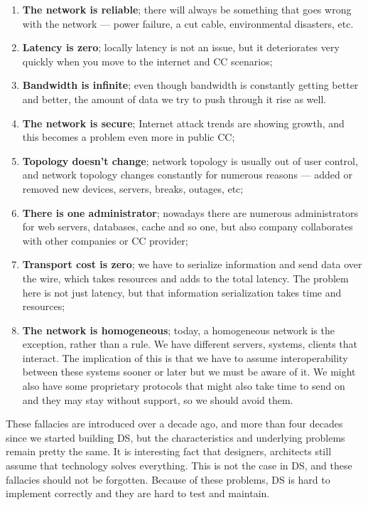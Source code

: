 \begin{enumerate}[start=1,label={(\bfseries \arabic*)}]\label{ds:8_fallacies}
	\item \textbf{The network is reliable}; there will always be something that goes wrong with the network --- power failure, a cut cable, environmental disasters, etc.
	\item \textbf{Latency is zero}; locally latency is not an issue, but it deteriorates very quickly when you move to the internet and CC scenarios;
	\item \textbf{Bandwidth is infinite}; even though bandwidth is constantly getting better and better, the amount of data we try to push through it rise as well.
	\item \textbf{The network is secure};  Internet attack trends are showing growth, and this becomes a problem even more in public CC;
	\item \textbf{Topology doesn't change}; network topology is usually out of user control, and network topology changes constantly for numerous reasons --- added or removed new devices, servers, breaks, outages, etc;
	\item \textbf{There is one administrator}; nowadays there are numerous administrators for web servers, databases, cache and so one, but also company collaborates with other companies or CC provider;
	\item \textbf{Transport cost is zero}; we have to serialize information and send data over the wire, which takes resources and adds to the total latency. The problem here is not just latency, but that information serialization takes time and resources;
	\item \textbf{The network is homogeneous}; today, a homogeneous network is the exception, rather than a rule. We have different servers, systems, clients that interact. The implication of this is that we have to assume interoperability between these systems sooner or later but we must be aware of it. We might also have some proprietary protocols that might also take time to send on and they may stay without support, so we should avoid them.
\end{enumerate}

\noindent
These fallacies are introduced over a decade ago, and more than four decades since we started building DS, but the characteristics and underlying problems remain pretty the same. It is interesting fact that designers, architects still assume that technology solves everything. This is not the case in DS, and these fallacies should not be forgotten. Because of these problems, DS is hard to implement correctly and they are hard to test and maintain.
%
%
